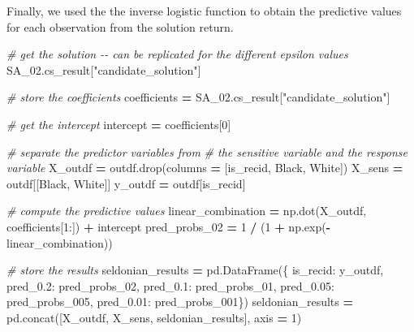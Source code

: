 \documentclass[12pt, twoside]{amherstthesis}
\newenvironment{Shaded}{\begin{snugshade}}{\end{snugshade}}
\newcommand{\CommentTok}[1]{\textcolor[rgb]{0.56,0.35,0.01}{\textit{#1}}}
\newcommand{\DecValTok}[1]{\textcolor[rgb]{0.00,0.00,0.81}{#1}}
\newcommand{\NormalTok}[1]{#1}
\newcommand{\OperatorTok}[1]{\textcolor[rgb]{0.81,0.36,0.00}{\textbf{#1}}}
\newcommand{\StringTok}[1]{\textcolor[rgb]{0.31,0.60,0.02}{#1}}
\begin{document}
\noindent Finally, we used the the inverse logistic function to obtain the predictive values for each observation from the solution return.
\begin{Shaded}
\begin{Highlighting}[]
\CommentTok{\# get the solution {-}{-} can be replicated for the different epsilon values}
\NormalTok{SA\_02.cs\_result[}\StringTok{"candidate\_solution"}\NormalTok{]}

\CommentTok{\# store the coefficients}
\NormalTok{coefficients }\OperatorTok{=}\NormalTok{ SA\_02.cs\_result[}\StringTok{"candidate\_solution"}\NormalTok{]}

\CommentTok{\# get the intercept}
\NormalTok{intercept }\OperatorTok{=}\NormalTok{ coefficients[}\DecValTok{0}\NormalTok{]}

\CommentTok{\# separate the predictor variables from }
\CommentTok{\# the sensitive variable and the response variable}
\NormalTok{X\_outdf }\OperatorTok{=}\NormalTok{ outdf.drop(columns }\OperatorTok{=}\NormalTok{ [}\StringTok{\textquotesingle{}is\_recid\textquotesingle{}}\NormalTok{, }\StringTok{\textquotesingle{}Black\textquotesingle{}}\NormalTok{, }\StringTok{\textquotesingle{}White\textquotesingle{}}\NormalTok{])}
\NormalTok{X\_sens }\OperatorTok{=}\NormalTok{ outdf[[}\StringTok{\textquotesingle{}Black\textquotesingle{}}\NormalTok{, }\StringTok{\textquotesingle{}White\textquotesingle{}}\NormalTok{]]}
\NormalTok{y\_outdf }\OperatorTok{=}\NormalTok{ outdf[}\StringTok{\textquotesingle{}is\_recid\textquotesingle{}}\NormalTok{]}

\CommentTok{\# compute the predictive values}
\NormalTok{linear\_combination }\OperatorTok{=}\NormalTok{ np.dot(X\_outdf, coefficients[}\DecValTok{1}\NormalTok{:]) }\OperatorTok{+}\NormalTok{ intercept}
\NormalTok{pred\_probs\_02 }\OperatorTok{=} \DecValTok{1} \OperatorTok{/}\NormalTok{ (}\DecValTok{1} \OperatorTok{+}\NormalTok{ np.exp(}\OperatorTok{{-}}\NormalTok{linear\_combination))}
\end{Highlighting}
\end{Shaded}
\begin{Shaded}
\begin{Highlighting}[]
\CommentTok{\# store the results }
\NormalTok{seldonian\_results }\OperatorTok{=}\NormalTok{ pd.DataFrame(\{}
  \StringTok{\textquotesingle{}is\_recid\textquotesingle{}}\NormalTok{: y\_outdf, }
  \StringTok{\textquotesingle{}pred\_0.2\textquotesingle{}}\NormalTok{: pred\_probs\_02, }
  \StringTok{\textquotesingle{}pred\_0.1\textquotesingle{}}\NormalTok{: pred\_probs\_01, }
  \StringTok{\textquotesingle{}pred\_0.05\textquotesingle{}}\NormalTok{: pred\_probs\_005, }
  \StringTok{\textquotesingle{}pred\_0.01\textquotesingle{}}\NormalTok{: pred\_probs\_001\})}
\NormalTok{seldonian\_results }\OperatorTok{=}\NormalTok{ pd.concat([X\_outdf, X\_sens, seldonian\_results], }
\NormalTok{axis }\OperatorTok{=} \DecValTok{1}\NormalTok{)}
\end{Highlighting}
\end{Shaded}
\end{document}
